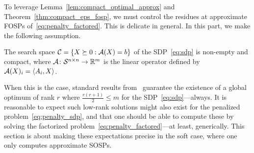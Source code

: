 
To leverage Lemma~\ref{lem:compact_optimal_approx} and Theorem~\ref{thm:compact_eps_fosp}, we must control the residues at approximate FOSPs of~\eqref{eq:penalty_factored}. This is delicate in general. In this part, we make the following assumption.
\begin{assumption}\label{assu:compactnonempty}
	The search space $\mathcal{C} = \{ X \succeq 0 : \mathcal{A}(X) = b \}$ of the SDP~\eqref{eq:sdp} is non-empty and compact, where $\mathcal{A} \colon \mathcal{S}^{n\times n} \to \mathbb{R}^m$ is the linear operator defined by $\mathcal{A}(X)_i = \left\langle A_i, X \right\rangle$.
\end{assumption}
When this is the case, standard results from~\citep{barvinok1995problems,pataki1998rank} guarantee the existence of a global optimum of rank $r$ where $\frac{r(r+1)}{2} \leq m$ for the SDP~\eqref{eq:sdp}---always. It is reasonable to expect such low-rank solutions might also exist for the penalized problem~\eqref{eq:penalty_sdp}, and that one should be able to compute these by solving the factorized problem~\eqref{eq:penalty_factored}---at least, generically. This section is about making these expectations precise in the soft case, where one only computes approximate SOSPs.

